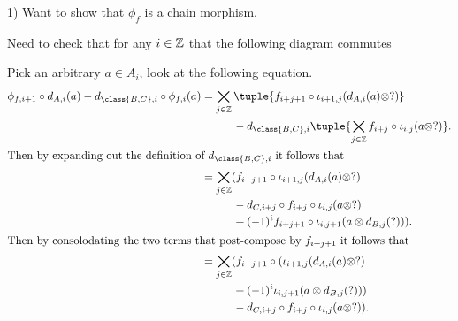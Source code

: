 \begin{remark}
    1) Want to show that \( \phi_f \) is a chain morphism.

    Need to check that for any \( i \in {\mathbb{Z}} \) that the following diagram commutes
    \begin{center}
    \end{center}
    Pick an arbitrary \( a \in A_i \), look at the following equation.
    \begin{align*}
        \phi_{f, i + 1} \circ d_{A, i}(a) - d_{\class{B, C}, i} \circ \phi_{f, i}(a)
        &= \bigtimes_{j \in \Zb} \tuple{ f_{i + j + 1} \circ \iota_{i + 1, j} (d_{A, i}(a) \otimes ?) } \\
        &\hspace{1cm}- d_{\class{B, C}, i} \tuple{ \bigtimes_{j \in \Zb} f_{i + j} \circ \iota_{i, j} (a \otimes ?) }. \\
        \intertext{Then by expanding out the definition of \( d_{\class{B, C}, i} \) it follows that}
        &= \bigtimes_{j \in \Zb} ( f_{i + j + 1} \circ \iota_{i + 1, j} (d_{A, i}(a) \otimes ?) \\
        &\hspace{1cm} - d_{C, i + j} \circ f_{i + j} \circ \iota_{i, j} (a \otimes ?) \\
        &\hspace{1cm} + (-1)^i f_{i + j + 1} \circ \iota_{i, j + 1} (a \otimes d_{B, j}(?)) ). \\
        \intertext{Then by consolodating the two terms that post-compose by \( f_{i + j + 1} \) it follows that}
        &= \bigtimes_{j \in \Zb} ( f_{i + j + 1} \circ ( \iota_{i + 1, j} (d_{A, i}(a) \otimes ?) \\
        &\hspace{1cm} + (-1)^i \iota_{i, j + 1} (a \otimes d_{B, j}(?)) ) \\
        &\hspace{1cm} - d_{C, i + j} \circ f_{i + j} \circ \iota_{i, j} (a \otimes ?) ). \\

\end{align*}
\end{remark}
